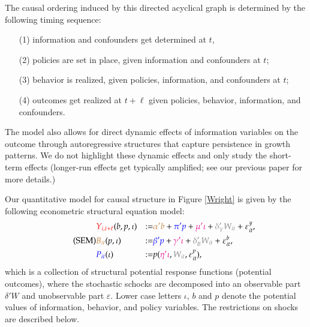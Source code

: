 \documentclass[9pt,twoside,lineno]{pnas-new}
\theoremstyle{definition}
\def\bcolor{\color{brown}}
\def\pcolor{\color{blue}}
\def\icolor{\color{magenta}}
\def\wcolor{\color{gray}}
\def\ycolor{\color{red}}
\begin{document}
The causal ordering induced by this directed acyclical graph is determined by the following
timing sequence: %
\begin{itemize}
\item[(1)]  information and confounders get determined at $t$,
\item[(2)] policies are set in place, given information and confounders at $t$;
\item[(3)] behavior is realized, given policies, information, and confounders at $t$;
\item[(4)] outcomes get realized at $t+\ell$ given policies, behavior, information, and confounders.
\end{itemize}

The model also allows for direct dynamic effects of information variables on the outcome through autoregressive structures that capture persistence in growth patterns. We do not highlight these dynamic effects and only study the short-term effects (longer-run effects get typically amplified; see our previous paper \cite{chernozhukov2021} for more details.)

Our quantitative model for causal structure in Figure \ref{Wright} is given by the following econometric structural equation model:\begin{equation} \label{eqn:SEM1} \tag{SEM}
  \begin{aligned}
   &  {\ycolor Y_{i,t+\ell}} (b,p,\iota) &:=& {\bcolor \alpha ' b}  +  {\pcolor \pi 'p} +
    {\icolor \mu'\iota } + {\wcolor \delta_Y 'W_{it}} + \varepsilon^y_{it}, \\
   &  {\bcolor B_{it}} (p,\iota) &:= & {\pcolor \beta'p } + {\icolor \gamma'\iota} +      {\wcolor\delta_B 'W_{it} } + \varepsilon^b_{it}, \\
   & {\pcolor P_{it}}   (\iota) & := &  p ({\icolor \eta'\iota}, {\wcolor W_{it}},  \varepsilon^p_{it} ), 
         \end{aligned}
 \end{equation}
which is a collection of structural potential response functions (potential outcomes), where the stochastic schocks
are decomposed into an observable part $\delta' W$ and unobservable part $\varepsilon$.  Lower case letters
$\iota$, $b$ and $p$ denote the potential values of information, behavior, and policy variables. The restrictions on shocks are described below. 
\end{document}
